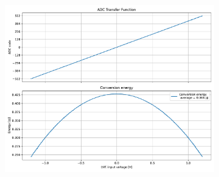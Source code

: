 \documentclass[varwidth]{standalone}
\begin{document}
\begin{figure}
\begin{subfigure}{0.32\textwidth}
    \includegraphics[width=\textwidth]{energy.pdf}
  \end{subfigure}
\end{figure}
\end{document}
